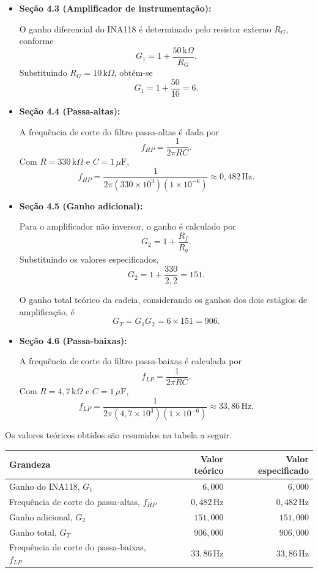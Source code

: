 \documentclass[11pt,a4paper]{article}
\begin{document}
\begin{itemize}
    \item \textbf{Seção 4.3 (Amplificador de instrumentação):}
    
    O ganho diferencial do INA118 é determinado pelo resistor externo $R_G$, conforme
    \[
    G_1 = 1 + \frac{50\,\text{k}\Omega}{R_G}.
    \]
    Substituindo $R_G = 10\,\text{k}\Omega$, obtém-se
    \[
    G_1 = 1 + \frac{50}{10} = 6.
    \]

    \vspace{0.3cm}
    \item \textbf{Seção 4.4 (Passa-altas):}

    A frequência de corte do filtro passa-altas é dada por
    \[
    f_{HP} = \frac{1}{2\pi RC}.
    \]
    Com $R = 330\,\text{k}\Omega$ e $C = 1\,\mu\text{F}$,
    \[
    f_{HP} = \frac{1}{2\pi(330\times10^3)(1\times10^{-6})}
    \approx 0{,}482\,\text{Hz}.
    \]

    \vspace{0.3cm}
    \item \textbf{Seção 4.5 (Ganho adicional):}

    Para o amplificador não inversor, o ganho é calculado por
    \[
    G_2 = 1 + \frac{R_f}{R_g}.
    \]
    Substituindo os valores especificados,
    \[
    G_2 = 1 + \frac{330}{2{,}2} = 151.
    \]

    O ganho total teórico da cadeia, considerando os ganhos dos dois estágios de amplificação, é
    \[
    G_T = G_1G_2 = 6 \times 151 = 906.
    \]

    \vspace{0.3cm}
    \item \textbf{Seção 4.6 (Passa-baixas):}

    A frequência de corte do filtro passa-baixas é calculada por
    \[
    f_{LP} = \frac{1}{2\pi RC}.
    \]
    Com $R = 4{,}7\,\text{k}\Omega$ e $C = 1\,\mu\text{F}$,
    \[
    f_{LP} = \frac{1}{2\pi(4{,}7\times10^3)(1\times10^{-6})}
    \approx 33{,}86\,\text{Hz}.
    \]
\end{itemize}

Os valores teóricos obtidos são resumidos na tabela a seguir.

\begin{center}
\renewcommand{\arraystretch}{1.2}
\begin{tabular}{@{}lrr@{}}
\toprule
\textbf{Grandeza} & \textbf{Valor teórico} & \textbf{Valor especificado} \\
\midrule
Ganho do INA118, $G_1$ & $6{,}000$ & $6{,}000$ \\
Frequência de corte do passa-altas, $f_{HP}$ & $0{,}482\,\text{Hz}$ & $0{,}482\,\text{Hz}$ \\
Ganho adicional, $G_2$ & $151{,}000$ & $151{,}000$ \\
Ganho total, $G_T$ & $906{,}000$ & $906{,}000$ \\
Frequência de corte do passa-baixas, $f_{LP}$ & $33{,}86\,\text{Hz}$ & $33{,}86\,\text{Hz}$ \\
\bottomrule
\end{tabular}
\end{center}
\end{document}
